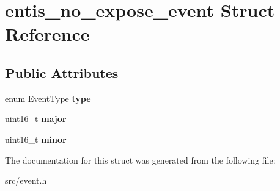 \hypertarget{structentis__no__expose__event}{}\section{entis\+\_\+no\+\_\+expose\+\_\+event Struct Reference}
\label{structentis__no__expose__event}
\subsection*{Public Attributes}
\begin{DoxyCompactItemize}
\item 
\mbox{\label{structentis__no__expose__event_ae97828a656b3c946522b40c755063a50}} 
enum Event\+Type {\bfseries type}
\item 
\mbox{\label{structentis__no__expose__event_a7de719a7057a1c3a1937d26c452d4abb}} 
uint16\+\_\+t {\bfseries major}
\item 
\mbox{\label{structentis__no__expose__event_aeea14ed19ef9e3f2e17aec8e879119bc}} 
uint16\+\_\+t {\bfseries minor}
\end{DoxyCompactItemize}


The documentation for this struct was generated from the following file\+:\begin{DoxyCompactItemize}
\item 
src/event.\+h\end{DoxyCompactItemize}
